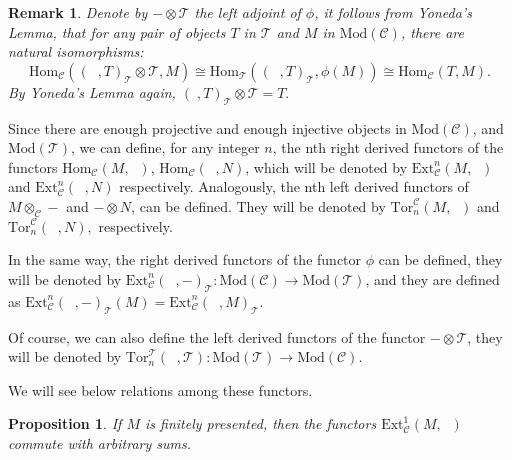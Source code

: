 \documentclass{amsart}
\theoremstyle{plain}
\newtheorem{proposition}{Proposition}
\newtheorem{remark}{Remark}
\numberwithin{equation}{section}
\begin{document}
\begin{remark}
Denote by $-\otimes \mathcal{T}$ the left adjoint of $\phi $, it follows
from Yoneda's Lemma, that for any pair of objects $T$ in $\mathcal{T}$ and $M $ in $\mathrm{Mod}(\mathcal{C})$, there are natural isomorphisms:
\begin{equation*}
\mathrm{Hom}_{\mathcal{C}}((\;\;,T)_{\mathcal{T}}\otimes \mathcal{T},M)\cong
\mathrm{Hom}_{\mathcal{T}}((\;\;,T)_{\mathcal{T}},\phi (M))\cong \mathrm{Hom}_{\mathcal{C}}(T,M)\text{.}
\end{equation*}By Yoneda's Lemma again, $(\;,T)_{\mathcal{T}}\otimes \mathcal{T}=T.$
\end{remark}

Since there are enough projective and enough injective objects in $\mathrm{Mod}(\mathcal{C})$, and $\mathrm{Mod}(\mathcal{T})$, we can define, for any
integer $n$, the nth right derived functors of the functors $\mathrm{Hom}_{\mathcal{C}}(M,\;\;)$, $\mathrm{Hom}_{\mathcal{C}}(\;\;,N)$, which will be
denoted by $\mathrm{Ext}_{\mathcal{C}}^{n}(M,\;\;)$ and $\mathrm{Ext}_{\mathcal{C}}^{n}(\;\;,N)$ respectively. Analogously, the nth left derived
functors of $M\otimes _{\mathcal{C}}-$ and $-\otimes N$, can be defined.
They will be denoted by $\mathrm{Tor}_{n}^{\mathcal{C}}(M,\;\;)$ and $\mathrm{Tor}_{n}^{\mathcal{C}}(\;\;,N),$ respectively.

In the same way, the right derived functors of the functor $\phi $ can be
defined, they will be denoted by $\mathrm{Ext}_{\mathcal{C}}^{n}(\;\;,-)_\mathcal{T}:\mathrm{Mod}(\mathcal{C})\rightarrow \mathrm{Mod}(\mathcal{T})$,
and they are defined as $\mathrm{Ext}_{\mathcal{C}}^{n}(\;\;,-)_\mathcal{T}(M)=\mathrm{Ext}_{\mathcal{C}}^{n}(\;\;,M)_\mathcal{T}$.

Of course, we can also define the left derived functors of the functor $-\otimes \mathcal{T}$, they will be denoted by $\mathrm{Tor}_{n}^{\mathcal{T}}(\;\;,\mathcal{T}):\mathrm{Mod}(\mathcal{T})\rightarrow \mathrm{Mod}(\mathcal{C})$.

We will see below relations among these functors.

\begin{proposition}
\label{TC} If $M$ is finitely presented, then the functors $\mathrm{Ext}_{\mathcal{C}}^{1}(M,\;\;)$ commute with arbitrary sums.
\end{proposition}
\end{document}
